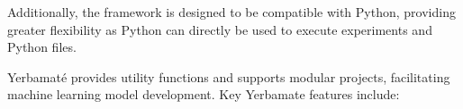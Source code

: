 Additionally, the framework is designed to be compatible with Python, providing greater flexibility as Python can directly be used to execute experiments and Python files.


Yerbamaté provides utility functions and supports modular projects, facilitating machine learning model development. Key Yerbamate features include:





